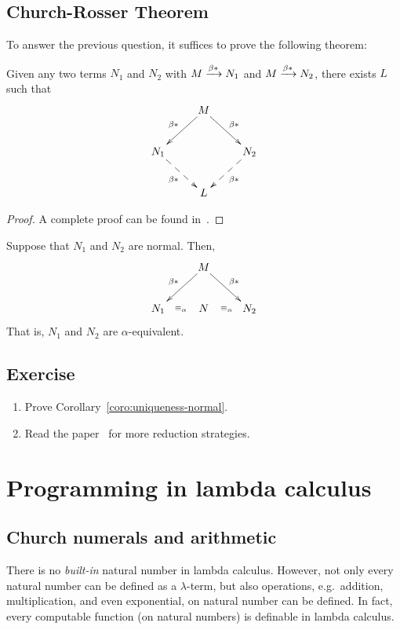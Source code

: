 \subsection{Church-Rosser Theorem}
To answer the previous question, it suffices to prove the following theorem:
\begin{theorem}
  Given any two terms $N_1$ and $N_2$ with $M \xrightarrow{\beta*} N_1$ and $M\xrightarrow{\beta*} N_2$,
  there exists $L$ such that
  \[
    \xymatrix{
      & M \ar[rd]^{\beta*} \ar[ld]_{\beta*} \\
      N_1 \ar@{-->}[rd]_{\beta*} & & N_2 \ar@{-->}[ld]^{\beta*} \\
      & L
    }
  \]
\end{theorem}
\begin{proof}
  A complete proof can be found in~\cite[Chapter 4]{Barendregt1984}.
\end{proof}
\begin{corollary}\label{coro:uniqueness-normal}
  Suppose that $N_1$ and $N_2$ are normal. Then, 
  \[
    \xymatrix{
      & M \ar[rd]^{\beta*} \ar[ld]_{\beta*} \\
      N_1 \ar@{}[r]|{\equiv_\alpha} & N & N_2 \ar@{}[l]|{\equiv_\alpha} \\
    }
  \]
  That is, $N_1$ and $N_2$ are $\alpha$-equivalent.
\end{corollary}
\begin{corollary}
\end{corollary}
\subsection*{Exercise}
\begin{enumerate}
  \item Prove Corollary~\ref{coro:uniqueness-normal}.
  \item Read the paper~\cite[Section 7]{Sestoft2002} for more reduction
    strategies.
\end{enumerate}
\section{Programming in lambda calculus}
\subsection{Church numerals and arithmetic}
There is no \emph{built-in} natural number in lambda calculus. However, 
not only every natural number can be defined as a $\lambda$-term, but also 
operations, e.g.\ addition, multiplication, and even exponential, on natural
number can be defined. In fact, every computable function (on natural numbers)
is definable in lambda calculus. 

